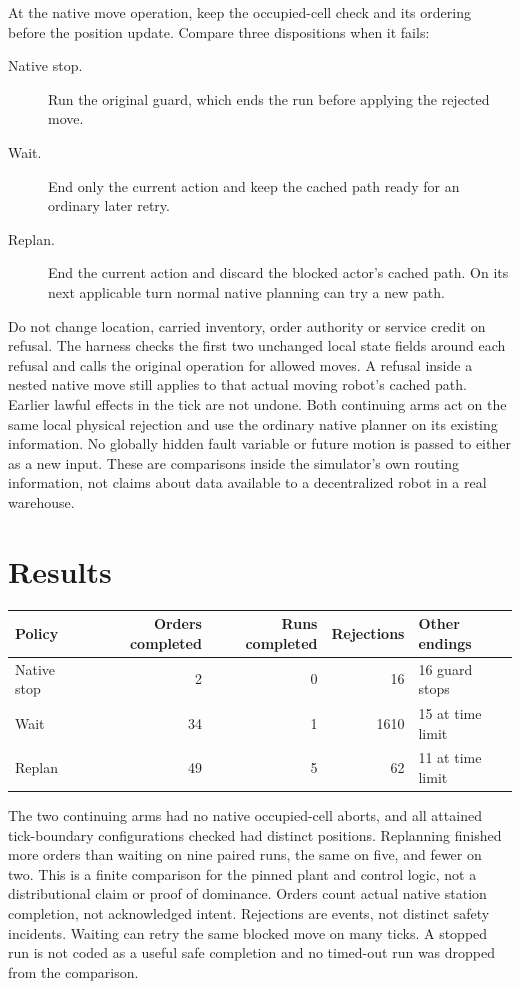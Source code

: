 \documentclass[11pt]{article}
\begin{document}
At the native move operation, keep the occupied-cell check and
its ordering before the position update. Compare three dispositions
when it fails:
\begin{description}
\item[Native stop.] Run the original guard, which ends the run before
  applying the rejected move.
\item[Wait.] End only the current action and keep the cached path
  ready for an ordinary later retry.
\item[Replan.] End the current action and discard the blocked actor's
  cached path. On its next applicable turn normal native planning
  can try a new path.
\end{description}
Do not change location, carried inventory, order authority or
service credit on refusal. The harness checks the first two
unchanged local state fields around each refusal and calls the
original operation for allowed moves. A refusal inside a nested
native move still applies to that actual moving robot's cached
path. Earlier lawful effects in the tick are not undone.
Both continuing arms act on the same local physical rejection and
use the ordinary native planner on its existing information.
No globally hidden fault variable or future motion is passed to
either as a new input. These are comparisons inside the simulator's
own routing information, not claims about data available to a
decentralized robot in a real warehouse.

\section{Results}
\begin{center}
\begin{tabular}{lrrrl}
\toprule
Policy & Orders completed & Runs completed & Rejections & Other endings\\
\midrule
Native stop & 2 & 0 & 16 & 16 guard stops\\
Wait & 34 & 1 & 1610 & 15 at time limit\\
Replan & 49 & 5 & 62 & 11 at time limit\\
\bottomrule
\end{tabular}
\end{center}
The two continuing arms had no native occupied-cell aborts,
and all attained tick-boundary configurations checked had
distinct positions. Replanning finished more orders than
waiting on nine paired runs, the same on five, and fewer
on two. This is a finite comparison for the pinned plant and
control logic, not a distributional claim or proof of dominance.
Orders count actual native station completion, not acknowledged
intent. Rejections are events, not distinct safety incidents.
Waiting can retry the same blocked move on many ticks.
A stopped run is not coded as a useful safe completion and no
timed-out run was dropped from the comparison.
\end{document}
